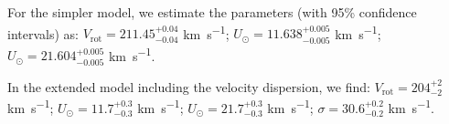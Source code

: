 For the simpler model, we estimate the parameters (with 95\% confidence intervals) as:  
$V_{\text{rot}} = 211.45_{-0.04}^{+0.04}$ \unit{\kilo\meter\per\second};  
$U_{\odot} = 11.638_{-0.005}^{+0.005}$ \unit{\kilo\meter\per\second};  
$U_{\odot} = 21.604_{-0.005}^{+0.005}$ \unit{\kilo\meter\per\second}.  

In the extended model including the velocity dispersion, we find: 
$V_{\text{rot}} = 204_{-2}^{+2}$ \unit{\kilo\meter\per\second};  
$U_{\odot} = 11.7_{-0.3}^{+0.3}$ \unit{\kilo\meter\per\second};  
$U_{\odot} = 21.7_{-0.3}^{+0.3}$ \unit{\kilo\meter\per\second};  
$\sigma = 30.6_{-0.2}^{+0.2}$ \unit{\kilo\meter\per\second}.  

